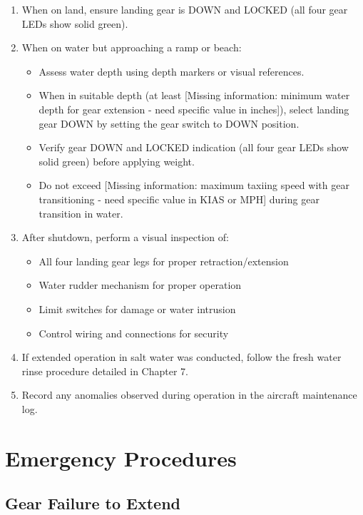 \documentclass[12pt,a4paper,twoside,openright]{book}
\begin{document}
\begin{enumerate}
    \item When on land, ensure landing gear is DOWN and LOCKED (all four gear LEDs show solid green).
    \item When on water but approaching a ramp or beach:
    \begin{itemize}
        \item Assess water depth using depth markers or visual references.
        \item When in suitable depth (at least {\color{red}[Missing information: minimum water depth for gear extension - need specific value in inches]}), select landing gear DOWN by setting the gear switch to DOWN position.
        \item Verify gear DOWN and LOCKED indication (all four gear LEDs show solid green) before applying weight.
        \item Do not exceed {\color{red}[Missing information: maximum taxiing speed with gear transitioning - need specific value in KIAS or MPH]} during gear transition in water.
    \end{itemize}
    \item After shutdown, perform a visual inspection of:
    \begin{itemize}
        \item All four landing gear legs for proper retraction/extension
        \item Water rudder mechanism for proper operation
        \item Limit switches for damage or water intrusion
        \item Control wiring and connections for security
    \end{itemize}
    \item If extended operation in salt water was conducted, follow the fresh water rinse procedure detailed in Chapter 7.
    \item Record any anomalies observed during operation in the aircraft maintenance log.
\end{enumerate}

\section{Emergency Procedures}

\subsection{Gear Failure to Extend}
\end{document}
